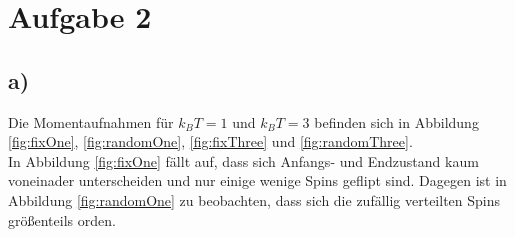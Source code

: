 \section*{Aufgabe 2}

\subsection*{a)}
Die Momentaufnahmen für $k_B T = 1$ und $k_B T = 3$ befinden sich in Abbildung \ref{fig:fixOne}, \ref{fig:randomOne}, \ref{fig:fixThree} und \ref{fig:randomThree}. \\

In Abbildung \ref{fig:fixOne} fällt auf, dass sich Anfangs- und Endzustand kaum voneinader unterscheiden und nur einige wenige Spins geflipt sind. Dagegen ist in Abbildung \ref{fig:randomOne} zu beobachten, dass sich die zufällig verteilten Spins größenteils orden. \\

